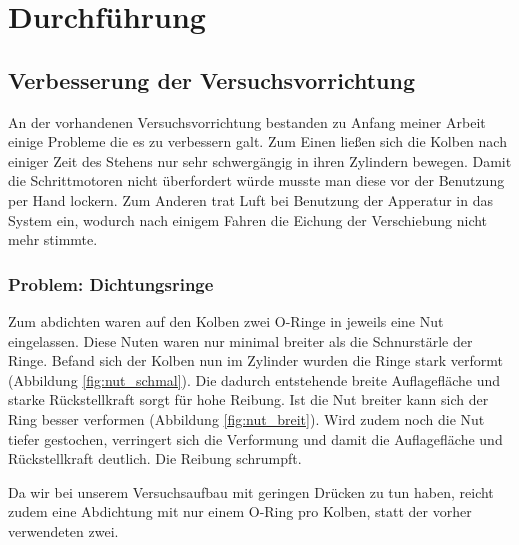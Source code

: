 \documentclass[
    11pt,
    ngerman
]{scrreprt}
\begin{document}
\chapter{Durchführung}

\section{Verbesserung der Versuchsvorrichtung}

An der vorhandenen Versuchsvorrichtung bestanden zu Anfang meiner Arbeit einige
Probleme die es zu verbessern galt. Zum Einen ließen sich die Kolben nach
einiger Zeit des Stehens nur sehr schwergängig in ihren Zylindern bewegen.
Damit die Schrittmotoren nicht überfordert würde musste man diese vor der
Benutzung per Hand lockern. Zum Anderen trat Luft bei Benutzung der Apperatur
in das System ein, wodurch nach einigem Fahren die Eichung der Verschiebung
nicht mehr stimmte.  

\subsection{Problem: Dichtungsringe}

Zum abdichten waren auf den Kolben zwei O-Ringe in jeweils eine Nut
eingelassen. Diese Nuten waren nur minimal breiter als die Schnurstärle der
Ringe. Befand sich der Kolben nun im Zylinder wurden die Ringe stark verformt
(Abbildung \ref{fig:nut_schmal}). Die dadurch entstehende breite Auflagefläche
und starke Rückstellkraft sorgt für hohe Reibung. Ist die Nut breiter kann sich
der Ring besser verformen (Abbildung \ref{fig:nut_breit}). Wird zudem noch die
Nut tiefer gestochen, verringert sich die Verformung und damit die
Auflagefläche und Rückstellkraft deutlich. Die Reibung schrumpft.

Da wir bei unserem Versuchsaufbau mit geringen Drücken zu tun haben, reicht
zudem eine Abdichtung mit nur einem O-Ring pro Kolben, statt der vorher
verwendeten zwei.
\end{document}
